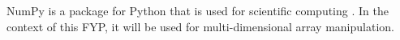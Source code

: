 NumPy is a package for Python that is used for scientific computing \parencite{numpy}.
In the context of this FYP, it will be used for multi-dimensional array manipulation.